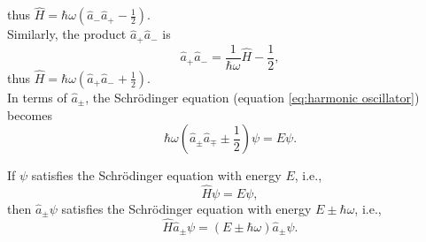 \documentclass[en, oneside]{vivi}
\begin{document}
thus $\hat H = \hbar \omega \left( \hat a_- \hat a_+ - \frac{1}{2} \right)$.\\
Similarly, the product $\hat a_+ \hat a_-$ is
\begin{equation}
    \hat a_+ \hat a_- = \frac{1}{\hbar \omega} \hat H - \frac{1}{2},
\end{equation}
thus $\hat H = \hbar \omega \left( \hat a_+ \hat a_- + \frac{1}{2} \right)$.\\
In terms of $\hat a_\pm$, the Schrödinger equation (equation \eqref{eq:harmonic oscillator}) becomes
\begin{equation} \label{eq:harmonic oscillator 2}
    \hbar \omega \left( \hat a_\pm \hat a_\mp \pm \frac{1}{2} \right) \psi = E\psi.
\end{equation}
\begin{thm}
    If $\psi$ satisfies the Schrödinger equation with energy $E$, i.e.,
    \begin{equation}
        \hat H \psi = E\psi,
    \end{equation}
    then $\hat a_\pm \psi$ satisfies the Schrödinger equation with energy $E \pm \hbar \omega$, i.e.,
    \begin{equation}
        \hat H \hat a_\pm \psi = (E \pm \hbar \omega) \hat a_\pm \psi.
    \end{equation}
\end{thm}
\end{document}
